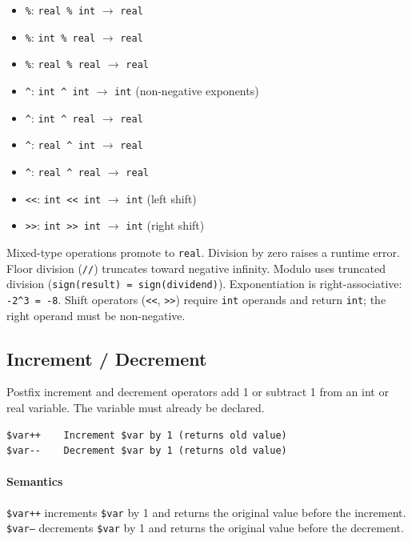 \documentclass{report}
\begin{document}
\begin{itemize}
\item \texttt{\%}: \texttt{real \% int} $\rightarrow$ \texttt{real}
\item \texttt{\%}: \texttt{int \% real} $\rightarrow$ \texttt{real}
\item \texttt{\%}: \texttt{real \% real} $\rightarrow$ \texttt{real}
\item \texttt{\^{}}: \texttt{int \^{} int} $\rightarrow$ \texttt{int} (non-negative exponents)
\item \texttt{\^{}}: \texttt{int \^{} real} $\rightarrow$ \texttt{real}
\item \texttt{\^{}}: \texttt{real \^{} int} $\rightarrow$ \texttt{real}
\item \texttt{\^{}}: \texttt{real \^{} real} $\rightarrow$ \texttt{real}
\item \texttt{<<}: \texttt{int << int} $\rightarrow$ \texttt{int} (left shift)
\item \texttt{>>}: \texttt{int >> int} $\rightarrow$ \texttt{int} (right shift)
\end{itemize}

Mixed-type operations promote to \texttt{real}. Division by zero raises a runtime error. Floor division (\texttt{//}) truncates toward negative infinity. Modulo uses truncated division (\texttt{sign(result) = sign(dividend)}). Exponentiation is right-associative: \texttt{-2\^{}3 = -8}. Shift operators (\texttt{<<}, \texttt{>>}) require \texttt{int} operands and return \texttt{int}; the right operand must be non-negative.

\subsection{Increment / Decrement}
Postfix increment and decrement operators add 1 or subtract 1 from an int or real variable. The variable must already be declared.
\begin{verbatim}
$var++    Increment $var by 1 (returns old value)
$var--    Decrement $var by 1 (returns old value)
\end{verbatim}

\paragraph{Semantics}
\texttt{\$var++} increments \texttt{\$var} by 1 and returns the original value before the increment.
\texttt{\$var--} decrements \texttt{\$var} by 1 and returns the original value before the decrement.
\end{document}

